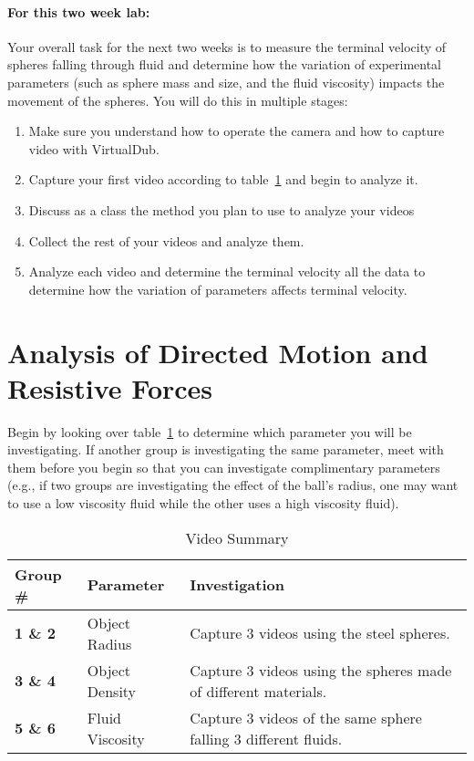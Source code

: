 \paragraph{For this two week lab:} Your overall task for the next two weeks is to measure the terminal velocity of spheres falling through fluid and determine how the variation of experimental parameters (such as sphere mass and size, and the fluid viscosity) impacts the movement of the spheres.
You will do this in multiple stages:
\begin{enumerate}
\item Make sure you understand how to operate the camera and how to capture video with VirtualDub.
\item Capture your first video according to table~\ref{tab:exp2video} and begin to analyze it.
\item Discuss as a class the method you plan to use to analyze your videos
\item Collect the rest of your videos and analyze them.
\item Analyze each video and determine the terminal velocity all the data to determine how the variation of parameters affects terminal velocity.
\end{enumerate}

\section{Analysis of Directed Motion and Resistive Forces}
Begin by looking over table~\ref{tab:exp2video} to determine which parameter you will be investigating.
If another group is investigating the same parameter, meet with them before you begin so that you can investigate complimentary parameters (e.g., if two groups are investigating the effect of the ball's radius, one may want to use a low viscosity fluid while the other uses a high viscosity fluid).

\begin{table}[ht]
\centering
\begin{tabular}{|l|l|p{10cm}|}
\hline
 \textbf{Group \#} & \textbf{Parameter} & \textbf{Investigation} \\ \hline
 \textbf{1 \& 2} & Object Radius & Capture 3 videos using the steel spheres. \\ \hline
 \textbf{3 \& 4} & Object Density & Capture 3 videos using the spheres made of different materials. \\ \hline
 \textbf{5 \& 6} & Fluid Viscosity & Capture 3 videos of the same sphere falling 3 different fluids. \\ \hline
\end{tabular}
\caption{Video Summary}
\label{tab:exp2video}
\end{table}

